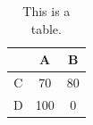 \documentclass[english, dvipdfmx]{ampmt}             %
\def\numberofspines{1}
\begin{document}
\begin{table}[htbp]
  \caption{This is a table.}
  \centering
  \begin{tabular}{c|cc}
      &  A  &  B \\
    \hline
    C &  70 & 80 \\
    D & 100 &  0
  \end{tabular}
\end{table}

\fi
\ifoutputcover
\cleardoublepage
\makecover                      %
\makespine[\numberofspines]     %
\fi
\ifoutputabstractforsubmission
\makeabstractforsubmission      %
\fi
\end{document}
